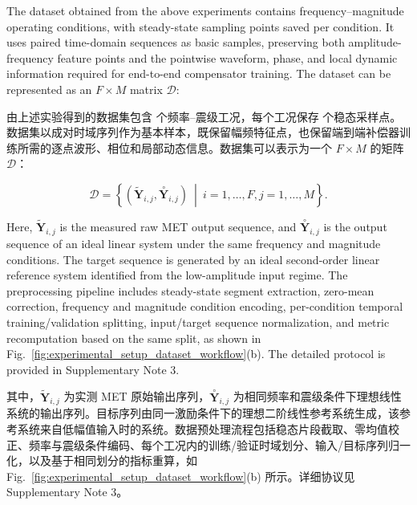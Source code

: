 \documentclass[sn-nature]{sn-jnl}
\newif\ifCNENEnglish
\newif\ifCNENBilingual
\newcommand{\CNEN}[2]{%
    \ifCNENBilingual
        #1%
        \if\relax\detokenize{#2}\relax\else\par #2\fi%
    \else
        \ifCNENEnglish
            #2%
        \else
            #1%
        \fi
    \fi
}
\newcommand{\fidx}{i} %
\newcommand{\fmax}{F} %
\newcommand{\midx}{j} %
\newcommand{\mmax}{M} %
\newcommand{\dataset}{{\mathcal{D}}} %
\newcommand{\yseq}{{\mathbf{Y}}} %
\newcommand{\ideal}[1]{\overset{\circ}{#1}} %
\newcommand{\exam}[1]{\tilde{#1}} %
\begin{document}
\CNEN{由上述实验得到的数据集包含 \valDatasetOperatingPoints{} 个频率--震级工况，每个工况保存 \valDatasetPointsPerRecord{} 个稳态采样点。数据集以成对时域序列作为基本样本，既保留幅频特征点，也保留端到端补偿器训练所需的逐点波形、相位和局部动态信息。数据集可以表示为一个 $\fmax \times \mmax$ 的矩阵 $\dataset$：}{The dataset obtained from the above experiments contains \valDatasetOperatingPoints{} frequency--magnitude operating conditions, with \valDatasetPointsPerRecord{} steady-state sampling points saved per condition. It uses paired time-domain sequences as basic samples, preserving both amplitude-frequency feature points and the pointwise waveform, phase, and local dynamic information required for end-to-end compensator training. The dataset can be represented as an $\fmax \times \mmax$ matrix $\dataset$:%
}

\begin{equation}
    \dataset = \left\{ \left(\exam{\yseq}_{\fidx,\midx}, \ideal{\yseq}_{\fidx,\midx} \right) \ \middle| \ \fidx = 1, \dots, \fmax, \midx = 1, \dots, \mmax \right\}.
    \label{eq:dataset}
\end{equation}

\CNEN{其中，$\exam{\yseq}_{\fidx,\midx}$ 为实测 MET 原始输出序列，$\ideal{\yseq}_{\fidx,\midx}$ 为相同频率和震级条件下理想线性系统的输出序列。目标序列由同一激励条件下的理想二阶线性参考系统生成，该参考系统来自低幅值输入时的系统。数据预处理流程包括稳态片段截取、零均值校正、频率与震级条件编码、每个工况内的训练/验证时域划分、输入/目标序列归一化，以及基于相同划分的指标重算，如 Fig.~\ref{fig:experimental_setup_dataset_workflow}(b) 所示。详细协议见 Supplementary Note 3。}{Here, $\exam{\yseq}_{\fidx,\midx}$ is the measured raw MET output sequence, and $\ideal{\yseq}_{\fidx,\midx}$ is the output sequence of an ideal linear system under the same frequency and magnitude conditions. The target sequence is generated by an ideal second-order linear reference system identified from the low-amplitude input regime. The preprocessing pipeline includes steady-state segment extraction, zero-mean correction, frequency and magnitude condition encoding, per-condition temporal training/validation splitting, input/target sequence normalization, and metric recomputation based on the same split, as shown in Fig.~\ref{fig:experimental_setup_dataset_workflow}(b). The detailed protocol is provided in Supplementary Note 3.%
}
\end{document}
